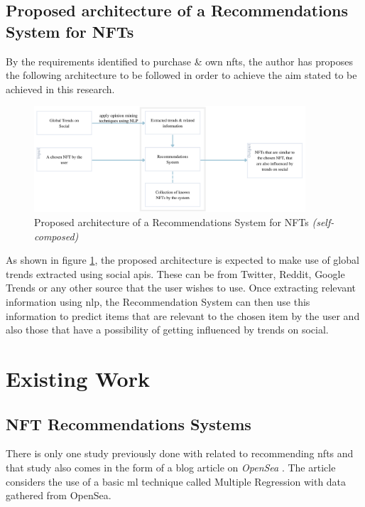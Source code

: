 \subsection{Proposed architecture of a Recommendations System for NFTs}
By the requirements identified to purchase \& own \gls{nft}s, the author has proposes the following architecture to be followed in order to achieve the aim stated to be achieved in this research.

\begin{figure}[h!]
\centering
\includegraphics[width=0.9\textwidth]{images/LR/Proposed Architecture for domain.png}
\caption{Proposed architecture of a Recommendations System for NFTs \textit{(self-composed)}}
\label{fig:proposed-recommendations-architecture}
\end{figure}

As shown in figure \ref{fig:proposed-recommendations-architecture}, the proposed architecture is expected to make use of global trends extracted using social \gls{api}s. These can be from Twitter, Reddit, Google Trends or any other source that the user wishes to use. Once extracting relevant information using \gls{nlp}, the Recommendation System can then use this information to predict items that are relevant to the chosen item by the user and also those that have a possibility of getting influenced by trends on social.



\section{Existing Work}
\subsection{NFT Recommendations Systems}

There is only one study previously done with related to recommending \gls{nft}s and that study also comes in the form of a blog article on \emph{OpenSea} \autocite{noauthor_what_2020}. The article considers the use of a basic \gls{ml} technique called Multiple Regression with data gathered from OpenSea.


